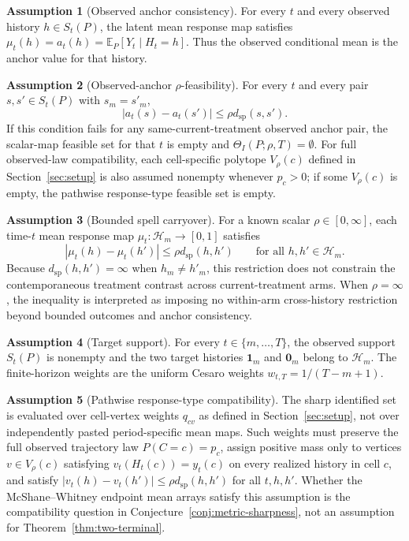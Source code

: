 \documentclass[11pt]{article}
\newcommand{\E}{\mathbb{E}}
\newcommand{\calH}{\mathcal{H}}
\theoremstyle{definition}
\newtheorem{assumption}{Assumption}
\theoremstyle{plain}
\theoremstyle{remark}
\begin{document}
\begin{assumption}[Observed anchor consistency]\label{ass:anchor-consistency}
For every \(t\) and every observed history \(h\in S_t(P)\), the latent mean response map satisfies \(\mu_t(h)=a_t(h)=\E_P[Y_t\mid H_t=h]\).  Thus the observed conditional mean is the anchor value for that history.
\end{assumption}

\begin{assumption}[Observed-anchor \(\rho\)-feasibility]\label{ass:anchor-feasibility}
For every \(t\) and every pair \(s,s'\in S_t(P)\) with \(s_m=s'_m\),
\[
  |a_t(s)-a_t(s')|\le \rho d_{\mathrm{sp}}(s,s').
\]
If this condition fails for any same-current-treatment observed anchor pair, the scalar-map feasible set for that \(t\) is empty and \(\Theta_I(P;\rho,T)=\emptyset\).  For full observed-law compatibility, each cell-specific polytope \(V_\rho(c)\) defined in Section~\ref{sec:setup} is also assumed nonempty whenever \(p_c>0\); if some \(V_\rho(c)\) is empty, the pathwise response-type feasible set is empty.
\end{assumption}

\begin{assumption}[Bounded spell carryover]\label{ass:rho-lipschitz}
For a known scalar \(\rho\in[0,\infty]\), each time-\(t\) mean response map \(\mu_t:\calH_m\to[0,1]\) satisfies
\[
  |\mu_t(h)-\mu_t(h')|\le \rho d_{\mathrm{sp}}(h,h')\qquad\text{for all }h,h'\in\calH_m.
\]
Because \(d_{\mathrm{sp}}(h,h')=\infty\) when \(h_m\ne h'_m\), this restriction does not constrain the contemporaneous treatment contrast across current-treatment arms.  When \(\rho=\infty\), the inequality is interpreted as imposing no within-arm cross-history restriction beyond bounded outcomes and anchor consistency.
\end{assumption}

\begin{assumption}[Target support]\label{ass:target-support}
For every \(t\in\{m,\ldots,T\}\), the observed support \(S_t(P)\) is nonempty and the two target histories \(\mathbf{1}_m\) and \(\mathbf{0}_m\) belong to \(\calH_m\).  The finite-horizon weights are the uniform Cesaro weights \(w_{t,T}=1/(T-m+1)\).
\end{assumption}

\begin{assumption}[Pathwise response-type compatibility]\label{ass:mean-law-compat}
The sharp identified set is evaluated over cell-vertex weights \(q_{cv}\) as defined in Section~\ref{sec:setup}, not over independently pasted period-specific mean maps.  Such weights must preserve the full observed trajectory law \(P(C=c)=p_c\), assign positive mass only to vertices \(v\in V_\rho(c)\) satisfying \(v_t(H_t(c))=y_t(c)\) on every realized history in cell \(c\), and satisfy \(|v_t(h)-v_t(h')|\le \rho d_{\mathrm{sp}}(h,h')\) for all \(t,h,h'\).  Whether the McShane--Whitney endpoint mean arrays satisfy this assumption is the compatibility question in Conjecture~\ref{conj:metric-sharpness}, not an assumption for Theorem~\ref{thm:two-terminal}.
\end{assumption}
\end{document}
